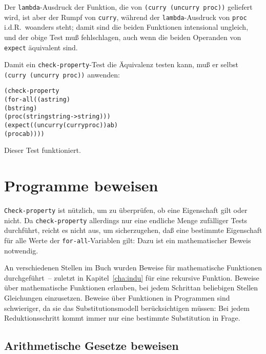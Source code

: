 Der \texttt{lambda}-Ausdruck der Funktion, die von \texttt{(curry
  (uncurry proc))} geliefert wird, ist aber der Rumpf von
\texttt{curry}, während der \texttt{lambda}-Ausdruck von \texttt{proc}
i.d.R.\ woanders steht; damit sind die beiden Funktionen intensional
ungleich, und der obige Test muß fehlschlagen, auch wenn die beiden
Operanden von \texttt{expect} äquivalent sind.

Damit ein \texttt{check-property}-Test die Äquivalenz testen kann, muß
er selbst \texttt{(curry (uncurry proc))} anwenden:
%
\begin{alltt}
(check-property
 (for-all ((a string)
           (b string)
           (proc (string string -> string)))
    (expect ((uncurry (curry proc)) a b)
            (proc a b))))
\end{alltt}
%
Dieser Test funktioniert.

\section{Programme beweisen}

\texttt{Check-property} ist nützlich, um zu überprüfen, ob eine
Eigenschaft gilt oder nicht.  Da \texttt{check-property} allerdings
nur eine endliche Menge zufälliger Tests durchführt, reicht es nicht
aus, um sicherzugehen, daß eine bestimmte Eigenschaft für alle Werte
der \texttt{for-all}-Variablen gilt: Dazu ist ein mathematischer
Beweis notwendig.

An verschiedenen Stellen im Buch wurden Beweise für mathematische
Funktionen durchgeführt~-- zuletzt in Kapitel~\ref{cha:indu} für
eine rekursive Funktion.  Beweise über mathematische Funktionen
erlauben, bei jedem Schrittan beliebigen Stellen Gleichungen
einzusetzen.  Beweise über Funktionen in Programmen sind schwieriger,
da sie das Substitutionsmodell berücksichtigen müssen: Bei jedem
Reduktionsschritt kommt immer nur eine bestimmte Substitution in
Frage.

\subsection{Arithmetische Gesetze beweisen}
\label{sec:scheme-arithmetik-beweis}

